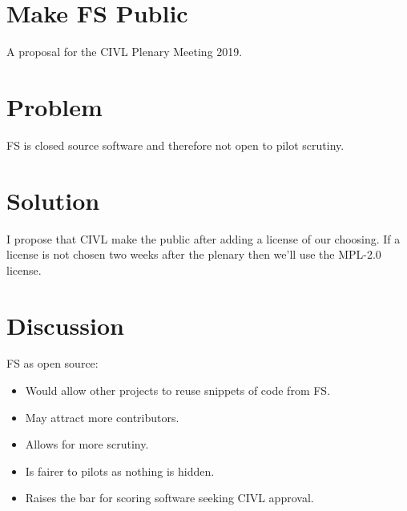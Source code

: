 \documentclass{article}
\begin{document}
\section*{Make FS Public}

A proposal for the CIVL Plenary Meeting 2019.

\section*{Problem}
FS is closed source software and therefore not open to pilot scrutiny.

\section*{Solution}
I propose that CIVL make the  public after adding a license of our choosing. If a license is not
chosen two weeks after the plenary then we'll use the MPL-2.0 license.

\section*{Discussion}
FS as open source:\\
\begin{itemize}
    \item Would allow other projects to reuse snippets of code from FS.
    \item May attract more contributors.
    \item Allows for more scrutiny.
    \item Is fairer to pilots as nothing is hidden.
    \item Raises the bar for scoring software seeking CIVL approval.
\end{itemize}
\end{document}
